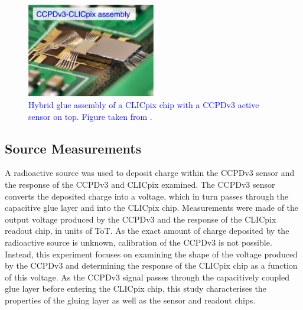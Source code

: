 \begin{figure}[h!]
\centering
\includegraphics[width=0.5\textwidth]{CLICdpVertex/Plots/Assemblies.png}
\caption[Hybrid glue assembly of a CLICpix chip with a CCPDv3 active sensor on top.  Figure taken from \cite{Dannheim:2015ffa}.]{\textcolor{blue}{Hybrid glue assembly of a CLICpix chip with a CCPDv3 active sensor on top.  Figure taken from \cite{Dannheim:2015ffa}.}}
\label{fig:assembly}
\end{figure}


\subsection{Source Measurements}
\label{sec:source}
A radioactive source was used to deposit charge within the CCPDv3 sensor and the response of the CCPDv3 and CLICpix examined.  The CCPDv3 sensor converts the deposited charge into a voltage, which in turn passes through the capacitive glue layer and into the CLICpix chip.  Measurements were made of the output voltage produced by the CCPDv3 and the response of the CLICpix readout chip, in units of ToT.  As the exact amount of charge deposited by the radioactive source is unknown, calibration of the CCPDv3 is not possible.  Instead, this experiment focuses on examining the shape of the voltage produced by the CCPDv3 and determining the response of the CLICpix chip as a function of this voltage.  As the CCPDv3 signal passes through the capacitively coupled glue layer before entering the CLICpix chip, this study characterises the properties of the gluing layer as well as the sensor and readout chips.


